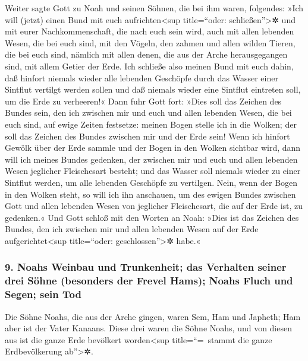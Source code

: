  Weiter sagte Gott zu Noah und seinen Söhnen, die bei ihm
waren, folgendes:  »Ich will (jetzt) einen Bund mit euch
aufrichten\textless sup title=``oder: schließen''\textgreater✲ und mit
eurer Nachkommenschaft, die nach euch sein wird,  auch
mit allen lebenden Wesen, die bei euch sind, mit den Vögeln, den zahmen
und allen wilden Tieren, die bei euch sind, nämlich mit allen denen, die
aus der Arche herausgegangen sind, mit allem Getier der Erde.
 Ich schließe also meinen Bund mit euch dahin, daß
hinfort niemals wieder alle lebenden Geschöpfe durch das Wasser einer
Sintflut vertilgt werden sollen und daß niemals wieder eine Sintflut
eintreten soll, um die Erde zu verheeren!«  Dann fuhr
Gott fort: »Dies soll das Zeichen des Bundes sein, den ich zwischen mir
und euch und allen lebenden Wesen, die bei euch sind, auf ewige Zeiten
festsetze:  meinen Bogen stelle ich in die Wolken; der
soll das Zeichen des Bundes zwischen mir und der Erde sein!
 Wenn ich hinfort Gewölk über der Erde sammle und der
Bogen in den Wolken sichtbar wird,  dann will ich meines
Bundes gedenken, der zwischen mir und euch und allen lebenden Wesen
jeglicher Fleischesart besteht; und das Wasser soll niemals wieder zu
einer Sintflut werden, um alle lebenden Geschöpfe zu vertilgen.
 Nein, wenn der Bogen in den Wolken steht, so will ich
ihn anschauen, um des ewigen Bundes zwischen Gott und allen lebenden
Wesen von jeglicher Fleischesart, die auf der Erde ist, zu gedenken.«
 Und Gott schloß mit den Worten an Noah: »Dies ist das
Zeichen des Bundes, den ich zwischen mir und allen lebenden Wesen auf
der Erde aufgerichtet\textless sup title=``oder:
geschlossen''\textgreater✲ habe.«

\hypertarget{noahs-weinbau-und-trunkenheit-das-verhalten-seiner-drei-suxf6hne-besonders-der-frevel-hams-noahs-fluch-und-segen-sein-tod}{%
\subsubsection{9. Noahs Weinbau und Trunkenheit; das Verhalten seiner
drei Söhne (besonders der Frevel Hams); Noahs Fluch und Segen; sein
Tod}\label{noahs-weinbau-und-trunkenheit-das-verhalten-seiner-drei-suxf6hne-besonders-der-frevel-hams-noahs-fluch-und-segen-sein-tod}}

 Die Söhne Noahs, die aus der Arche gingen, waren Sem,
Ham und Japheth; Ham aber ist der Vater Kanaans.  Diese
drei waren die Söhne Noahs, und von diesen aus ist die ganze Erde
bevölkert worden\textless sup title=``=~stammt die ganze Erdbevölkerung
ab''\textgreater✲.

